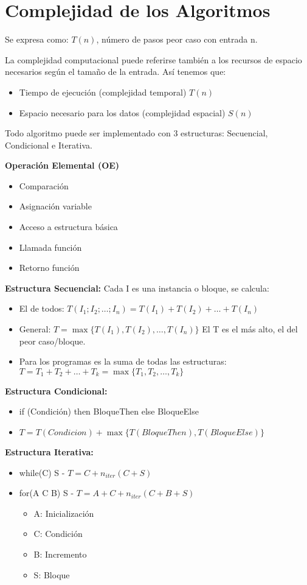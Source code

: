\section{Complejidad de los Algoritmos}\label{sec:complejidad-de-los-algoritmos}
Se expresa como: $T(n)$, número de pasos peor caso con entrada n.

La complejidad computacional puede referirse también a los recursos de espacio necesarios según el tamaño de la entrada. Así tenemos que:
\begin{itemize}
	\item Tiempo de ejecución (complejidad temporal) $T(n)$
	\item Espacio necesario para los datos (complejidad espacial) $S(n)$
\end{itemize}

Todo algoritmo puede ser implementado con 3 estructuras: Secuencial, Condicional e Iterativa.

\textbf{Operación Elemental (OE)}
\begin{itemize}
	\item Comparación
	\item Asignación variable
	\item Acceso a estructura básica
	\item Llamada función
	\item Retorno función
\end{itemize}

\textbf{Estructura Secuencial:} Cada I es una instancia o bloque, se calcula:
\begin{itemize}
	\item El de todos: $T(I_1; I_2; \dots; I_n) = T(I_1) + T(I_2) + \dots + T(I_n)$
	\item General: $T= \max \{T(I_1), T(I_2), \dots, T(I_n)\}$ El T es el más alto, el del peor caso/bloque.
	\item Para los programas es la suma de todas las estructuras: $T = T_1 + T_2 + \dots + T_k = \max \{ T_1, T_2, \dots, T_k \}$
\end{itemize}

\textbf{Estructura Condicional:}
\begin{itemize}
	\item if (Condición) then BloqueThen else BloqueElse
	\item $T = T(Condicion) + \max \{T(BloqueThen), T(BloqueElse)\}$
\end{itemize}

\textbf{Estructura Iterativa:}
\begin{itemize}
	\item while(C) S - $T = C + n_{iter} (C+S)$
	\item for(A C B) S - $T = A + C + n_{iter} (C+B+S)$
	      \begin{itemize}
		      \item A: Inicialización
		      \item C: Condición
		      \item B: Incremento
		      \item S: Bloque
	      \end{itemize}
\end{itemize}
\pagebreak

